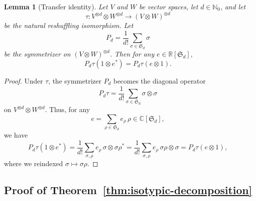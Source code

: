 \documentclass[11pt]{article}
\newcommand{\dsC}{\mathbb{C}}
\newcommand{\dsN}{\mathbb{N}}
\newcommand{\dsR}{\mathbb{R}}
\newtheorem{lemma}[theorem]{Lemma}
\theoremstyle{definition}
\begin{document}
\begin{lemma}[Transfer identity]\label{lem:cauchy-transfer}
  Let $V$ and $W$ be vector spaces, let $d\in\dsN_0$, and let
  \[
    \tau:V^{\otimes d}\otimes W^{\otimes d}\longrightarrow (V\otimes W)^{\otimes d}
  \]
  be the natural reshuffling isomorphism. Let
  \[
    P_d=\frac{1}{d!}\sum_{\sigma\in\mathfrak S_d}\sigma
  \]
  be the symmetrizer on $(V\otimes W)^{\otimes d}$. Then for any $e\in \dsR[\mathfrak S_d]$,
  \[
    P_d\tau(1\otimes e^*)
    =
    P_d\tau(e\otimes 1).
  \]
\end{lemma}
\begin{proof}
  Under $\tau$, the symmetrizer $P_d$ becomes the diagonal operator
  \[
    P_d\tau=\frac{1}{d!}\sum_{\sigma\in\mathfrak S_d}\sigma\otimes\sigma
  \]
  on $V^{\otimes d}\otimes W^{\otimes d}$. Thus, for any
  \[
    e=\sum_{\rho\in\mathfrak S_d} e_\rho\,\rho \in \dsC[\mathfrak S_d],
  \]
  we have
  \[
    P_d\tau(1\otimes e^*)
    =
    \frac{1}{d!}\sum_{\sigma,\rho} e_\rho\,\sigma\otimes \sigma\rho^*
    =
    \frac{1}{d!}\sum_{\sigma,\rho} e_\rho\,\sigma\rho\otimes \sigma
    =
    P_d\tau(e\otimes 1),
  \]
  where we reindexed $\sigma\mapsto \sigma\rho$.
\end{proof}

\subsection{Proof of Theorem~\ref{thm:isotypic-decomposition}}\label{sec:proof-main-decomposition}
\end{document}
